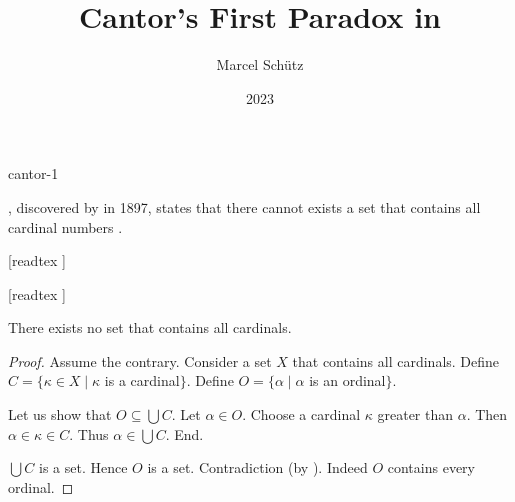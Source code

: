 \documentclass{stex}
\begin{document}
\title{Cantor's First Paradox in \Naproche}
\author{Marcel Schütz}
\date{2023}
\maketitle
\begin{smodule}{cantor-1}
\begin{sparagraph}
  \noindent \emph{}, discovered by  in 1897, states that there cannot exists a set that contains all cardinal numbers \cite[chapter 156]{Cantor1991}.
\end{sparagraph}

\begin{forthel}
  [readtex ]

  [readtex ]

  \begin{theorem*}\label{cantor_paradox_1}
    There exists no set that contains all cardinals.
  \end{theorem*}
  \begin{proof}
    Assume the contrary.
    Consider a set $X$ that contains all cardinals.
    Define $C = \{ \kappa \in X \mid \kappa$ is a cardinal$\}$.
    Define $O = \{ \alpha \mid \alpha$ is an ordinal$\}$.

    Let us show that $O \subseteq \bigcup C$.
      Let $\alpha \in O$.
      Choose a cardinal $\kappa$ greater than $\alpha$.
      Then $\alpha \in \kappa \in C$.
      Thus $\alpha \in \bigcup C$.
    End.

    $\bigcup C$ is a set.
    Hence $O$ is a set.
    Contradiction (by ).
    Indeed $O$ contains every ordinal.
  \end{proof}
\end{forthel}
\end{smodule}
\printbibliography
\end{document}
